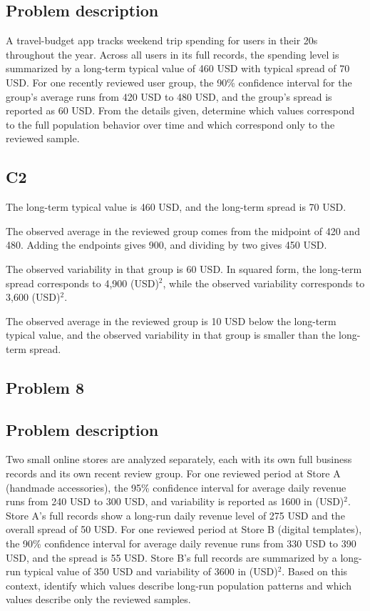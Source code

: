 \begin{ExamProblems}
		\subsection*{Problem description}
		A travel-budget app tracks weekend trip spending for users in their 20s throughout the year.
		Across all users in its full records, the spending level is summarized by a long-term typical value of 460 USD with typical spread of 70 USD.
		For one recently reviewed user group, the 90\% confidence interval for the group's average runs from 420 USD to 480 USD, and the group's spread is reported as 60 USD.
		From the details given, determine which values correspond to the full population behavior over time and which correspond only to the reviewed sample.

\subsection*{C2}
		The long-term typical value is 460 USD, and the long-term spread is 70 USD.

		The observed average in the reviewed group comes from the midpoint of 420 and 480.
		Adding the endpoints gives 900, and dividing by two gives 450 USD.

		The observed variability in that group is 60 USD.
		In squared form, the long-term spread corresponds to 4,900 (USD)$^2$, while the observed variability corresponds to 3,600 (USD)$^2$.

		The observed average in the reviewed group is 10 USD below the long-term typical value, and the observed variability in that group is smaller than the long-term spread.


		\newpage
		\item
		\subsection*{Problem 8}
		\subsection*{Problem description}
		Two small online stores are analyzed separately, each with its own full business records and its own recent review group.
		For one reviewed period at Store A (handmade accessories), the 95\% confidence interval for average daily revenue runs from 240 USD to 300 USD, and variability is reported as 1600 in (USD)$^2$.
		Store A's full records show a long-run daily revenue level of 275 USD and the overall spread of 50 USD.
		For one reviewed period at Store B (digital templates), the 90\% confidence interval for average daily revenue runs from 330 USD to 390 USD, and the spread is 55 USD.
		Store B's full records are summarized by a long-run typical value of 350 USD and variability of 3600 in (USD)$^2$.
		Based on this context, identify which values describe long-run population patterns and which values describe only the reviewed samples.


\end{ExamProblems}
